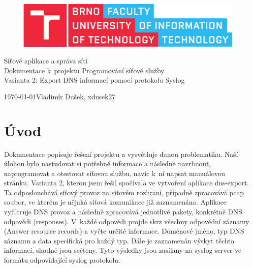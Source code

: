 \documentclass[11pt, a4paper, titlepage]{article}
\begin{document}
\begin{titlepage}
	\begin{center}
		\begin{figure}[htb]
			\centering
			\includegraphics[width=0.85\hsize]{fitlogo.pdf}
		\end{figure}
		{\Huge Síťové aplikace a správa sítí} \\
		\bigskip
		{\LARGE Dokumentace k~projektu Programování síťové služby} \\
		\bigskip
		{\Large Varianta 2: Export DNS informací pomocí protokolu Syslog}
	\end{center}
	{\Large \today \hfill Vladimír Dušek, xdusek27}
\end{titlepage}


\tableofcontents
\newpage


\section{Úvod}

Dokumentace popisuje řešení projektu a vysvětluje danou problematiku. Naší úlohou bylo nastudovat si potřebné informace a následně navrhnout, naprogramovat a otestovat síťovou službu, navíc k~ní napsat manuálovou stránku. Varianta 2, kterou jsem řešil spočívala ve vytvoření aplikace dns-export. Ta odposlouchává síťový provoz na síťovém rozhraní, případně zpracovává pcap soubor, ve kterém je nějaká síťová komunikace již zaznamenána. Aplikace vyfiltruje DNS provoz a následně zpracovává jednotlivé pakety, konkrétně DNS odpovědi (responses). V~každé odpovědi projde skrz všechny odpovědní záznamy (Answer resource records) a vyčte určité informace. Doménové jméno, typ DNS záznamu a data specifická pro každý typ. Dále je zaznamenán výskyt těchto informací, shodné jsou sečteny. Tyto výsledky jsou zasílany na syslog server ve formátu odpovídající syslog protokolu.
\end{document}
